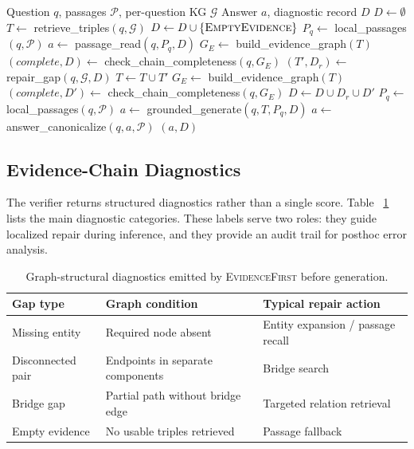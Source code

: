 \documentclass[runningheads]{llncs}
\newcommand{\sys}{\textsc{EvidenceFirst}\xspace}
\newcommand{\calG}{\mathcal{G}}
\newcommand{\calP}{\mathcal{P}}
\begin{document}
\begin{algorithm}[t]
\caption{\sys inference}
\label{alg:evidencefirst}
\begin{algorithmic}[1]
\Require Question $q$, passages $\calP$, per-question KG $\calG$
\Ensure Answer $a$, diagnostic record $D$
\State $D \gets \emptyset$
\State $T \gets$ retrieve\_triples$(q,\calG)$
    \State $D \gets D \cup \{\textsc{EmptyEvidence}\}$
    \State $P_q \gets$ local\_passages$(q,\calP)$
    \State $a \gets$ passage\_read$(q,P_q,D)$
\Else
    \State $G_E \gets$ build\_evidence\_graph$(T)$
    \State $(complete, D) \gets$ check\_chain\_completeness$(q,G_E)$
        \State $(T', D_r) \gets$ repair\_gap$(q,\calG,D)$
        \State $T \gets T \cup T'$
        \State $G_E \gets$ build\_evidence\_graph$(T)$
        \State $(complete, D') \gets$ check\_chain\_completeness$(q,G_E)$
        \State $D \gets D \cup D_r \cup D'$
    \EndIf
    \State $P_q \gets$ local\_passages$(q,\calP)$
    \State $a \gets$ grounded\_generate$(q,T,P_q,D)$
\EndIf
\State $a \gets$ answer\_canonicalize$(q,a,\calP)$
\State \Return $(a,D)$
\end{algorithmic}
\end{algorithm}

\subsection{Evidence-Chain Diagnostics}

The verifier returns structured diagnostics rather than a single score. Table
~\ref{tab:gap_types} lists the main diagnostic categories. These labels serve
two roles: they guide localized repair during inference, and they provide an
audit trail for posthoc error analysis.

\begin{table}[t]
\centering
\caption{Graph-structural diagnostics emitted by \sys before generation.}
\label{tab:gap_types}
\small
\begin{tabular}{lll}
\toprule
Gap type & Graph condition & Typical repair action \\
\midrule
Missing entity & Required node absent & Entity expansion / passage recall \\
Disconnected pair & Endpoints in separate components & Bridge search \\
Bridge gap & Partial path without bridge edge & Targeted relation retrieval \\
Empty evidence & No usable triples retrieved & Passage fallback \\
\bottomrule
\end{tabular}
\end{table}
\end{document}
